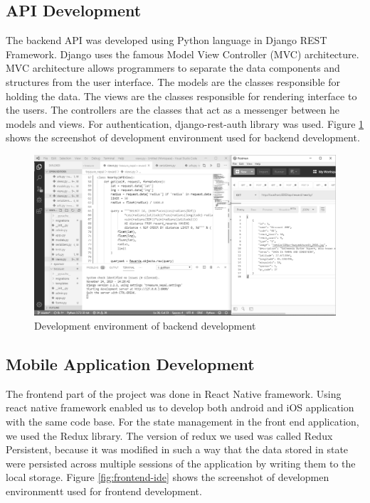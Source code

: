 \documentclass[12pt, a4paper, oneside]{article}
\begin{document}
\subsection{API Development}
The backend API was developed using Python language in Django REST Framework. Django uses the famous Model View Controller (MVC) architecture. MVC architecture allows programmers to separate the data components and structures from the user interface. The models are the classes responsible for holding the data. The views are the classes responsible for rendering interface to the users. The controllers are the classes that act as a messenger between he models and views. For authentication, django-rest-auth library was used. Figure \ref{fig:backend-ide} shows the screenshot of development environment used for backend development.

\begin{figure}[H]
\includegraphics[width=\linewidth, keepaspectratio]{ide/backend.png}
\centering
\caption{Development environment of backend development}
\label{fig:backend-ide}
\end{figure}

\subsection{Mobile Application Development}
The frontend part of the project was done in React Native framework. Using react native framework enabled us to develop both android and iOS application with the same code base. For the state management in the front end application, we used the Redux library. The version of redux we used was called Redux Persistent, because it was modified in such a way that the data stored in state were persisted across multiple sessions of the application by writing them to the local storage. Figure \ref{fig:frontend-ide} shows the screenshot of developmen environmentt used for frontend development.
\end{document}
